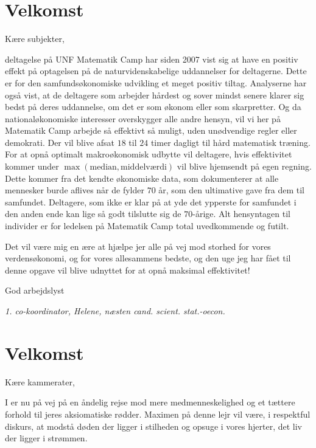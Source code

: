 

\begin{minipage}[b]{0.95\linewidth}
\begin{minipage}[t]{0.47\textwidth}
\vspace{3mm}

\section*{Velkomst}
Kære subjekter,

deltagelse på UNF Matematik Camp har siden 2007 vist sig at have en positiv effekt på optagelsen på de naturvidenskabelige uddannelser for deltagerne. Dette er for den samfundsøkonomiske udvikling et meget positiv tiltag. Analyserne har også vist, at de deltagere som arbejder hårdest og sover mindst senere klarer sig bedst på deres uddannelse, om det er som økonom eller som skarpretter. Og da nationaløkonomiske interesser overskygger alle andre hensyn, vil vi her på Matematik Camp arbejde så effektivt så muligt, uden unødvendige regler eller demokrati. Der vil blive afsat $18$ til $24$ timer dagligt til hård matematisk træning. For at opnå optimalt makroøkonomisk udbytte vil deltagere, hvis effektivitet kommer under $\max(\text{median},\text{middelværdi})$ vil blive hjemsendt på egen regning. Dette kommer fra det kendte økonomiske data, som dokumenterer at alle mennesker burde aflives når de fylder $70$ år, som den ultimative gave fra dem til samfundet. Deltagere, som ikke er klar på at yde det ypperste for samfundet i den anden ende kan lige så godt tilslutte sig de $70$-årige. Alt hensyntagen til individer er for ledelsen på Matematik Camp total uvedkommende og futilt. 

Det vil være mig en ære at hjælpe jer alle på vej mod storhed for vores verdensøkonomi, og for vores allesammens bedste, og den uge jeg har fået til denne opgave vil blive udnyttet for at opnå maksimal effektivitet!

God arbejdslyst 

{\flushright\emph{1. co-koordinator, Helene, næsten cand. scient. stat.-oecon.}}

\section*{Velkomst}
Kære kammerater,

I er nu på vej på en åndelig rejse mod mere medmenneskelighed og et tættere forhold til jeres aksiomatiske rødder. Maximen på denne lejr vil være, i respektful diskurs, at modstå døden der ligger i stilheden og opsuge i vores hjerter, det liv der ligger i strømmen. 


\end{minipage}
\end{minipage}
